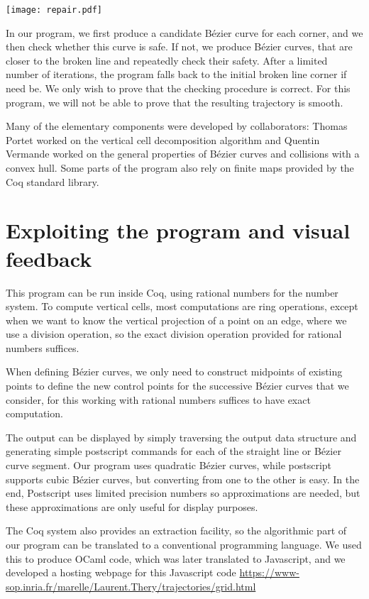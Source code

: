 \documentclass{easychair}
\begin{document}
\begin{center}
\texttt{[image: repair.pdf]}
\end{center}

In our program, we first produce a candidate Bézier curve for each
corner, and we then check whether this curve is safe.  If not, we
produce Bézier curves, that are closer to the broken line and
repeatedly check their safety.  After a limited number of iterations,
the program falls back to the initial broken line corner if need be.
We only wish to prove that the checking procedure is correct.  For
this program, we will not be able to prove that the resulting trajectory
is smooth.

Many of the elementary components were developed by collaborators:
Thomas Portet worked on the vertical cell decomposition algorithm and
Quentin Vermande worked on the general properties of Bézier curves and
collisions with a convex hull.  Some parts of the program also rely on
finite maps provided by the Coq standard library.

\section{Exploiting the program and visual feedback}
This program can be run inside Coq, using rational numbers for the
number system.  To compute vertical cells, most computations are ring
operations, except when we want to know the vertical projection of a
point on an edge, where we use a division operation, so the exact
division operation provided for rational numbers suffices.

When defining Bézier curves, we only need to construct midpoints of
existing points to define the new control points for the successive
Bézier curves that we consider, for this working with rational numbers
suffices to have exact computation.

The output can be displayed by simply traversing the
output data structure and generating simple postscript commands for
each of the straight line or Bézier curve segment.  Our program uses
quadratic Bézier curves, while postscript supports cubic Bézier
curves, but converting from one to the other is easy.  In the end,
Postscript uses limited precision numbers so approximations are
needed, but these approximations are only useful for display purposes.

The Coq system also provides an extraction facility, so the
algorithmic part of our program can be translated to a conventional
programming language.  We used this to produce OCaml code, which was
later translated to Javascript, and we developed a hosting webpage for
this Javascript code
\url{https://www-sop.inria.fr/marelle/Laurent.Thery/trajectories/grid.html}
\end{document}
